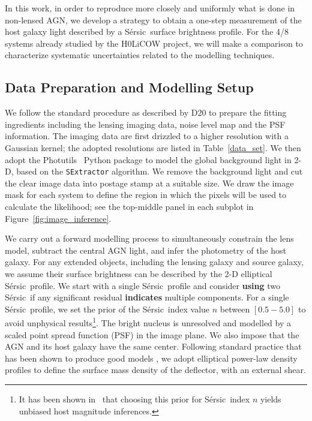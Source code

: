 \documentclass[fleqn,usenatbib]{mnras}
\newcommand{\sersic}{S\'ersic}
\begin{document}
In this work, in order to reproduce more closely and uniformly what is
done in non-lensed AGN, we develop a strategy to obtain a one-step
measurement of the host galaxy light described by a \sersic\ surface
brightness profile. For the 4/8 systems already studied by the H0LiCOW
project, we will make a comparison to characterize systematic
uncertainties related to the modelling techniques.

\subsection{Data Preparation and Modelling Setup}\label{sec:Modelling}

We follow the standard procedure as described by D20 to prepare the fitting ingredients including the lensing imaging data, noise level map and the PSF information. The imaging data are first drizzled to a higher resolution with a Gaussian kernel; the adopted resolutions are listed in Table~\ref{data_set}. We then adopt the {\sc Photutils}~\citep{photutils} Python package to model the global background light in 2-D, based on the \texttt{SExtractor} algorithm. We remove the background light and cut the clear image data into postage stamp at a suitable size. We draw the image mask for each system to define the region in which the pixels will be used to calculate the likelihood; see the top-middle panel in each subplot in Figure~\ref{fig:image_inference}.

We carry out a forward modelling process to simultaneously constrain the lens model, subtract the central AGN light, and infer the photometry of the host galaxy. For any extended objects, including the lensing galaxy and source galaxy, we assume their surface brightness can be described by the 2-D elliptical \sersic\ profile. We start with a single \sersic\ profile and consider {\bf using} two \sersic\ if any significant residual {\bf indicates} multiple components. For a single \sersic\ profile, we set the prior of the \sersic\ index value $n$ between $[0.5-5.0]$ to avoid unphysical results\footnote{It has been shown in~\citet{Ding2017a} that choosing this prior for \sersic\ index $n$ yields unbiased host magnitude inferences.}. The bright nucleus is unresolved and modelled by a scaled point spread function (PSF) in the image plane. We also impose that the AGN and its host galaxy have the same center. Following standard practice that has been shown to produce good models \citep[e.g.,][and references therein]{Treu2010}, we adopt elliptical power-law density profiles to define the surface mass density of the deflector, with an external shear.
\end{document}

